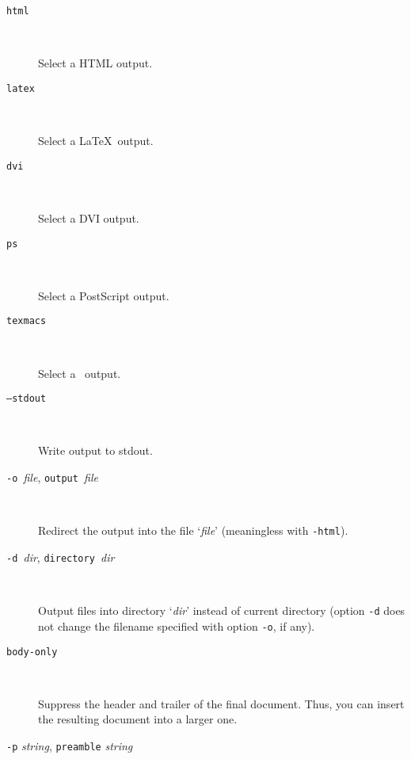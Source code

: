 \begin{description}

\item[\texttt{\mm{}html}] ~\par
  
  Select a HTML output.

\item[\texttt{\mm{}latex}] ~\par
  
  Select a \LaTeX\ output.

\item[\texttt{\mm{}dvi}] ~\par
  
  Select a DVI output.

\item[\texttt{\mm{}ps}] ~\par
  
  Select a PostScript output.

\item[\texttt{\mm{}texmacs}] ~\par
  
  Select a \texmacs\ output.

\item[\texttt{--stdout}] ~\par

  Write output to stdout.

\item[\texttt{-o }\textit{file}, \texttt{\mm{}output }\textit{file}] ~\par
  
  Redirect the output into the file `\textit{file}' (meaningless with
  \texttt{-html}).

\item[\texttt{-d }\textit{dir}, \texttt{\mm{}directory }\textit{dir}] ~\par

  Output files into directory `\textit{dir}' instead of current
  directory (option \texttt{-d} does not change the filename specified
  with option \texttt{-o}, if any).

\item[\texttt{\mm{}body-only}] ~\par

  Suppress the header and trailer of the final document. Thus, you can
  insert the resulting document into a larger one.

\item[\texttt{-p} \textit{string}, \texttt{\mm{}preamble} \textit{string}]~\par


\end{description}
